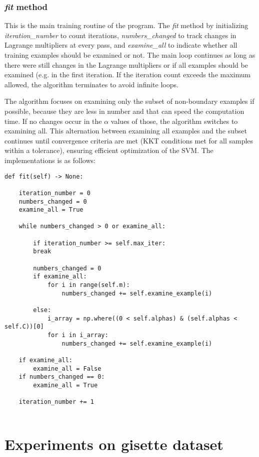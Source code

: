 \documentclass[10pt,a4paper]{article}
\begin{document}
\subsubsection{\textit{fit} method}
This is the main training routine of the program.
The \textit{fit} method by initializing \textit{iteration\_number} to count iterations, \textit{numbers\_changed} to track changes in Lagrange multipliers at every pass, and \textit{examine\_all} to indicate whether all training examples should be examined or not. The main loop continues as long as there were still changes in the Lagrange multipliers or if all examples should be examined (e.g. in the first iteration. If the iteration count exceeds the maximum allowed, the algorithm terminates to avoid infinite loops. 

The algorithm focuses on examining only the subset of non-boundary examples if possible, because they are less in number and that can speed the computation time. If no changes occur in the \(\alpha\) values of those, the algorithm switches to examining all. This alternation between examining all examples and the subset continues until convergence criteria are met (KKT conditions met for all samples within a tolerance), ensuring efficient optimization of the SVM. The implementations is as follows:\newpage

\begin{lstlisting}
def fit(self) -> None:

	iteration_number = 0
	numbers_changed = 0
	examine_all = True
	
	while numbers_changed > 0 or examine_all:

		if iteration_number >= self.max_iter:
		break
	
		numbers_changed = 0
		if examine_all:	
			for i in range(self.m):
				numbers_changed += self.examine_example(i)
	
		else: 
			i_array = np.where((0 < self.alphas) & (self.alphas < self.C))[0]
			for i in i_array:
				numbers_changed += self.examine_example(i)
	
	if examine_all:
		examine_all = False
	if numbers_changed == 0:
		examine_all = True
	
	iteration_number += 1
	
\end{lstlisting}



\section{Experiments on gisette dataset}
\end{document}
